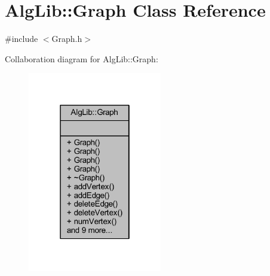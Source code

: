 \hypertarget{class_alg_lib_1_1_graph}{}\section{Alg\+Lib\+:\+:Graph Class Reference}
\label{class_alg_lib_1_1_graph}


{\ttfamily \#include $<$Graph.\+h$>$}



Collaboration diagram for Alg\+Lib\+:\+:Graph\+:\nopagebreak
\begin{figure}[H]
\begin{center}
\leavevmode
\includegraphics[width=166pt]{class_alg_lib_1_1_graph__coll__graph}
\end{center}
\end{figure}
